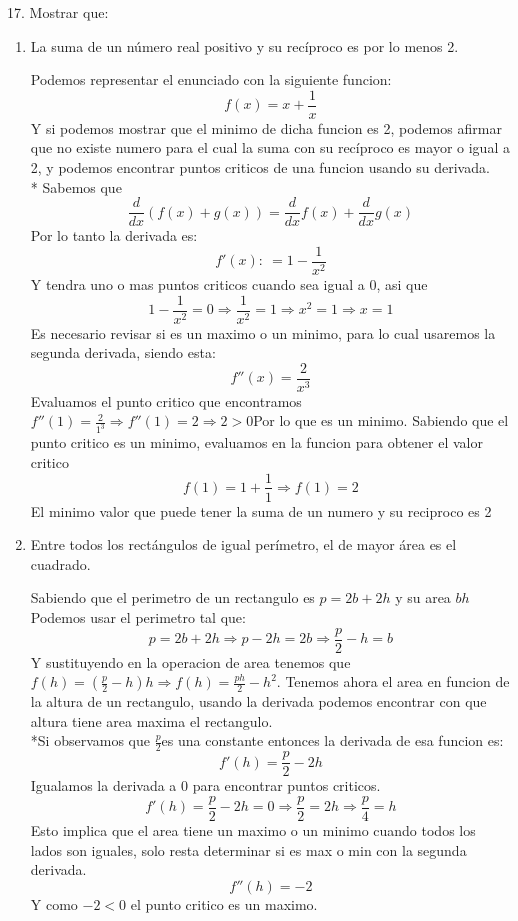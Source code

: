 \documentclass[12pt]{article}
\begin{document}
17. Mostrar que:

\begin{enumerate}[\hspace{9px} a)]
    \item La suma de un n\'umero real positivo y su rec\'iproco es por lo menos 2.\medskip
    
    Podemos representar el enunciado con la siguiente funcion:
    \[f(x) = x+\displaystyle\frac{1}{x}\] 
    Y si podemos mostrar que el minimo de dicha funcion es 2, podemos afirmar que no existe numero para el cual la suma con su rec\'iproco es mayor o igual a 2, y podemos encontrar puntos criticos de una funcion usando su derivada.\\*
    Sabemos que \[\displaystyle\frac{d}{dx}(f(x)+g(x)) = \displaystyle\frac{d}{dx}f(x)+\displaystyle\frac{d}{dx}g(x)\]
    Por lo tanto la derivada es: 
    \[f'(x): \ = 1-\displaystyle\frac{1}{x^2}\]
    Y tendra uno o mas puntos criticos cuando sea igual a 0, asi que \[1-\displaystyle\frac{1}{x^2}=0\Rightarrow\displaystyle\frac{1}{x^2}=1\Rightarrow x^2 = 1 \Rightarrow x=1\]   
    Es necesario revisar si es un maximo o un minimo, para lo cual usaremos la segunda derivada, siendo esta: \[f''(x)=\displaystyle\frac{2}{x^3}\]
    Evaluamos el punto critico que encontramos \(f''(1)=\displaystyle\frac{2}{1^3}\Rightarrow f''(1)=2\Rightarrow 2>0\)\quad Por lo que es un minimo.
    Sabiendo que el punto critico es un minimo, evaluamos en la funcion para obtener el valor critico
    \[f(1)=1+\displaystyle\frac{1}{1}\Rightarrow f(1)=2\]
    El minimo valor que puede tener la suma de un numero y su reciproco es 2\medskip

    \item Entre todos los rect\'angulos de igual per\'imetro, el de mayor \'area es el cuadrado.\medskip
    
    Sabiendo que el perimetro de un rectangulo es \(p=2b+2h\) y su area \(bh\)
    Podemos usar el perimetro tal que: \[p=2b+2h\Rightarrow p-2h=2b\Rightarrow \displaystyle\frac{p}{2}-h=b\]
    Y sustituyendo en la operacion de area tenemos que \(f(h)=(\displaystyle\frac{p}{2}-h)h\Rightarrow f(h)=\displaystyle\frac{ph}{2}-h^2\).
    Tenemos ahora el area en funcion de la altura de un rectangulo, usando la derivada podemos encontrar con que altura tiene area maxima el rectangulo. \\*Si observamos que \(\displaystyle\frac{p}{2}\)es una constante entonces la derivada de esa funcion es: 
    \[f'(h)=\displaystyle\frac{p}{2}-2h\]
    Igualamos la derivada a 0 para encontrar puntos criticos.
    \[f'(h)=\displaystyle\frac{p}{2}-2h=0\Rightarrow \displaystyle\frac{p}{2}=2h\Rightarrow \displaystyle\frac{p}{4}=h\]
    Esto implica que el area tiene un maximo o un minimo cuando todos los lados son iguales, solo resta determinar si es max o min con la segunda derivada.
    \[f''(h)=-2\]
    Y como \(-2<0\) el punto critico es un maximo.\medskip


\end{enumerate}
\end{document}

